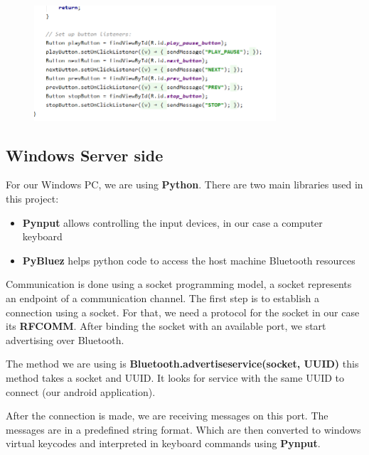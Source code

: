 \documentclass{article}
\begin{document}
\begin{figure}[ht]
\centering
\includegraphics[width=90mm]{./sendMsg.png}
\end{figure}

\subsection{Windows Server side}

For our Windows PC, we are using \textbf{Python}. There are two main libraries used in this project:

\begin{itemize}
\item \textbf{Pynput} allows controlling the input devices, in our case a computer keyboard

\item \textbf{PyBluez} helps python code to access the host machine Bluetooth resources
\end{itemize}

Communication is done using a socket programming model, a socket represents an endpoint of a
communication channel. The first step is to establish a connection using a socket. For that, we need
a protocol for the socket in our case its \textbf{RFCOMM}. After binding the socket with an
available port, we start advertising over Bluetooth.

The method we are using is \textbf{Bluetooth.advertise\textunderscore service(socket, UUID)} this
method takes a socket and UUID. It looks for service with the same UUID to connect (our android
application).

After the connection is made, we are receiving messages on this port. The messages are in a
predefined string format. Which are then converted to windows virtual keycodes and interpreted in
keyboard commands using \textbf{Pynput}.
\end{document}
